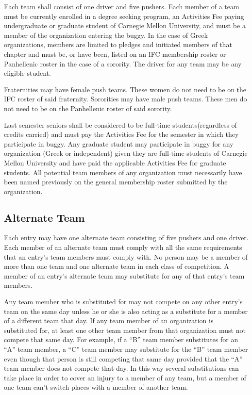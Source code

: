 	Each team shall consist of one driver and five pushers. Each member of a team must be currently enrolled in a degree seeking program, an Activities Fee paying undergraduate or graduate student of Carnegie Mellon University, and must be a member of the organization entering the buggy. In the case of Greek organizations, members are limited to pledges and initiated members of that chapter and must be, or have been, listed on an IFC membership roster or Panhellenic roster in the case of a sorority. The driver for any team may be any eligible student.

	Fraternities may have female push teams. These women do not need to be on the IFC roster of said fraternity. Sororities may have male push teams. These men do not need to be on the Panhellenic roster of said sorority.

	Last semester seniors shall be considered to be full-time students(regardless of credits carried) and must pay the Activities Fee for the semester in which they participate in buggy. Any graduate student may participate in buggy for any organization (Greek or independent) given they are full-time students of Carnegie Mellon University and have paid the applicable Activities Fee for graduate students. All potential team members of any organization must necessarily have been named previously on the general membership roster submitted by the organization.

\subsection{Alternate Team}

	Each entry may have one alternate team consisting of five pushers and one driver. Each member of an alternate team must comply with all the same requirements that an entry's team members must comply with. No person may be a member of more than one team and one alternate team in each class of competition. A member of an entry's alternate team may substitute for any of that entry's team members.

	Any team member who is substituted for may not compete on any other entry's team on the same day unless he or she is also acting as a substitute for a member of a different team that day. If any team member of an organization is substituted for, at least one other team member from that organization must not compete that same day. For example, if a “B” team member substitutes for an “A” team member, a “C” team member may substitute for the “B” team member even though that person is still competing that same day provided that the “A” team member does not compete that day. In this way several substitutions can take place in order to cover an injury to a member of any team, but a member of one team can't switch places with a member of another team.	

